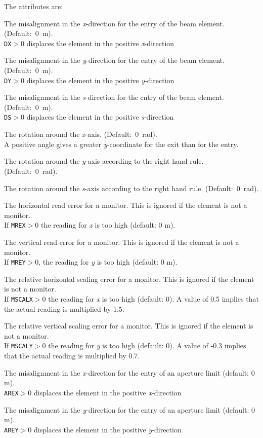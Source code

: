 The attributes are: 
\begin{madlist}
   The misalignment in the {\it x}-direction for the entry of
  the beam element. (Default:~0~m).  \\ 
  {\tt DX}$>$0 displaces the element in the positive {\it x}-direction 
  
   The misalignment in the {\it y}-direction for the entry of
  the beam element. (Default:~0~m). \\
  {\tt DY}$>$0 displaces the element in the positive {\it y}-direction 

   The misalignment in the {\it s}-direction for the entry of
  the beam element. (Default:~0~m). \\
  {\tt DS}$>$0 displaces the element in the positive {\it s}-direction 
  
   The rotation around the {\it x}-axis. (Default:~0~rad). \\ 
  A positive angle gives a greater {\it y}-coordinate for the exit
  than for the entry. 

   The rotation around the {\it y}-axis according to the
  right hand rule. (Default:~0~rad).  

   The rotation around the {\it s}-axis according to the
  right hand rule. (Default:~0~rad).  

   The horizontal read error for a monitor. This is ignored if
  the element is not a monitor. \\
  If {\tt MREX}$>$0 the reading for {\it x} is too high (default: 0 m). 

   The vertical read error for a monitor. This is ignored if
  the element is not a monitor. \\  
  If {\tt MREY}$>$0, the reading for {\it y} is too high (default: 0 m). 

   The relative horizontal scaling error for a monitor. This
  is ignored if the element is not a monitor. \\ 
  If {\tt MSCALX}$>$0 the reading for {\it x} is too high (default: 0). A
  value of 0.5 implies that the actual reading is multiplied by 1.5.  

   The relative vertical scaling error for a monitor. This is
  ignored if the element is not a monitor. \\  
  If {\tt MSCALY}$>$0 the reading for {\it y} is too high (default: 0). A
  value of -0.3 implies that the actual reading is multiplied by 0.7.  

   The misalignment in the {\it x}-direction for the entry
  of an aperture limit (default: 0 m). \\ 
  {\tt AREX}$>$0 displaces the element in the positive {\it x}-direction 

   The misalignment in the {\it y}-direction for the entry
  of an aperture limit (default: 0 m). \\ 
  {\tt AREY}$>$0 displaces the element in the positive {\it y}-direction 

\end{madlist}

